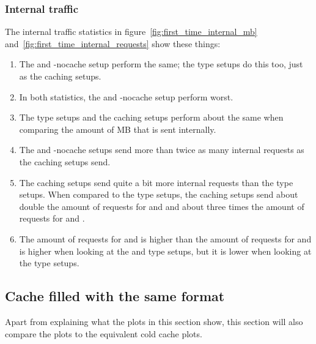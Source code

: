 \documentclass[twoside,openright]{uva-bachelor-thesis}
\begin{document}

\FloatBarrier

\subsubsection{Internal traffic}
The internal traffic statistics in figure~\ref{fig:first_time_internal_mb}
and~\ref{fig:first_time_internal_requests} show these things:
\begin{enumerate}
    \item
        The \ipp and \lt-nocache setup perform the same; the \cdn type setups
        do this too, just as the caching \lt setups.

    \item
        In both statistics, the \ipp and \lt-nocache setup perform worst.

    \item
        The \cdn type setups and the caching \lt setups perform about the same
        when comparing the amount of MB that is sent internally.

    \item
        The \ipp and \lt-nocache setups send more than twice as many internal
        requests as the caching \lt setups send.

    \item
        The caching \lt setups send quite a bit more internal requests than the
        \cdn type setups. When compared to the \cdn type setups, the caching \lt
        setups send about double the amount of requests for \dash and \iss and
        about three times the amount of requests for \hds and \hls.

    \item
        The amount of requests for \hds and \hls is higher than the amount of
        requests for \dash and \iss is higher when looking at the \ipp and \lt
        type setups, but it is lower when looking at the \cdn type setups.


\end{enumerate}




\FloatBarrier

\subsection{Cache filled with the same format}
Apart from explaining what the plots in this section show, this section will
also compare the plots to the equivalent cold cache plots.
\end{document}
